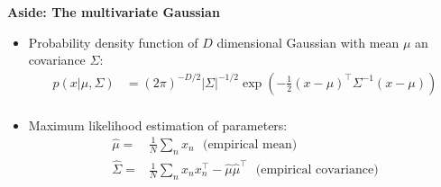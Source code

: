 

\textbf{Aside: The multivariate Gaussian} 
\begin{itemize}
\item Probability density function of $D$ dimensional Gaussian with mean $\mu$ an covariance $\Sigma$: \begin{align}p(x| \mu, \Sigma)&= (2\pi)^{-D/2}|\Sigma|^{-1/2} \exp \left(-\frac{1}{2} (x-\mu)^\top \Sigma^{-1} (x-\mu) \right) \\
 \end{align}
\item  Maximum likelihood estimation of parameters: \begin{align}
\hat\mu= &\frac{1}{N}\sum_n x_n\mbox{~~(empirical mean)}\\ 
\hat \Sigma= &\frac{1}{N} \sum_n x_n x_n^\top- \hat\mu \hat \mu^\top\mbox{~~(empirical covariance)} 
 \end{align}
\end{itemize}


